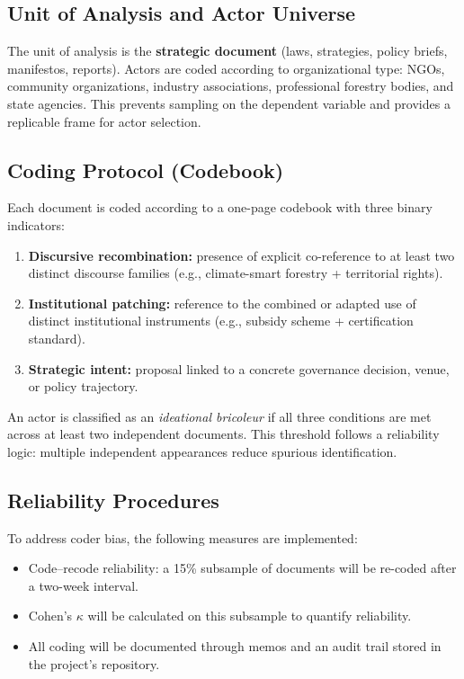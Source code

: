 \subsection*{Unit of Analysis and Actor Universe}

The unit of analysis is the \textbf{strategic document} (laws, strategies, policy 
briefs, manifestos, reports).  
Actors are coded according to organizational type: NGOs, community organizations, 
industry associations, professional forestry bodies, and state agencies. This 
prevents sampling on the dependent variable and provides a replicable frame 
for actor selection.



\subsection*{Coding Protocol (Codebook)}

Each document is coded according to a one-page codebook with three binary indicators:

\begin{enumerate}
    \item \textbf{Discursive recombination:} presence of explicit co-reference 
    to at least two distinct discourse families (e.g., climate-smart forestry 
    + territorial rights).
    \item \textbf{Institutional patching:} reference to the combined or adapted 
    use of distinct institutional instruments (e.g., subsidy scheme + certification standard).
    \item \textbf{Strategic intent:} proposal linked to a concrete governance 
    decision, venue, or policy trajectory.
\end{enumerate}

An actor is classified as an \textit{ideational bricoleur} if all three 
conditions are met across at least two independent documents. This threshold 
follows a reliability logic: multiple independent appearances reduce spurious 
identification.



\subsection*{Reliability Procedures}

To address coder bias, the following measures are implemented:

\begin{itemize}
    \item Code--recode reliability: a 15\% subsample of documents will be re-coded after a two-week interval.
    \item Cohen’s $\kappa$ will be calculated on this subsample to quantify reliability. 
    \item All coding will be documented through memos and an audit trail stored in the project’s repository.
\end{itemize}



